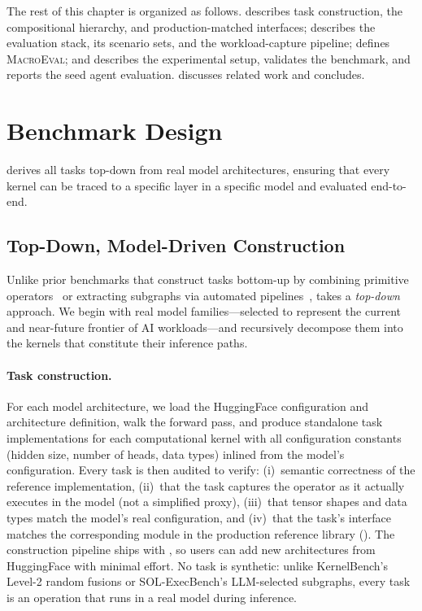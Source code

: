 The rest of this chapter is organized as follows.
 describes task construction, the compositional hierarchy, and production-matched interfaces;  describes the evaluation stack, its scenario sets, and the workload-capture pipeline;  defines \textsc{MacroEval}; and  describes the experimental setup, validates the benchmark, and reports the seed agent evaluation.
 discusses related work and  concludes.

\section{Benchmark Design}
\label{fastkernels:sec:benchmark}

\FastKernels derives all tasks top-down from real model architectures, ensuring that every kernel can be traced to a specific layer in a specific model and evaluated end-to-end.

\subsection{Top-Down, Model-Driven Construction}
\label{fastkernels:sec:construction}

Unlike prior benchmarks that construct tasks bottom-up by combining primitive operators~\citep{kernelbench} or extracting subgraphs via automated pipelines~\citep{solexecbench}, \FastKernels takes a \emph{top-down} approach.
We begin with real model families---selected to represent the current and near-future frontier of AI workloads---and recursively decompose them into the kernels that constitute their inference paths.

\paragraph{Task construction.}
For each model architecture, we load the HuggingFace configuration and architecture definition, walk the forward pass, and produce standalone task implementations for each computational kernel with all configuration constants (hidden size, number of heads, data types) inlined from the model's configuration.
Every task is then audited to verify: (i)~semantic correctness of the reference implementation, (ii)~that the task captures the operator as it actually executes in the model (not a simplified proxy), (iii)~that tensor shapes and data types match the model's real configuration, and (iv)~that the task's interface matches the corresponding module in the production reference library ().
The construction pipeline ships with \FastKernels, so users can add new architectures from HuggingFace with minimal effort.
No task is synthetic: unlike KernelBench's Level-2 random fusions or SOL-ExecBench's LLM-selected subgraphs, every task is an operation that runs in a real model during inference.

